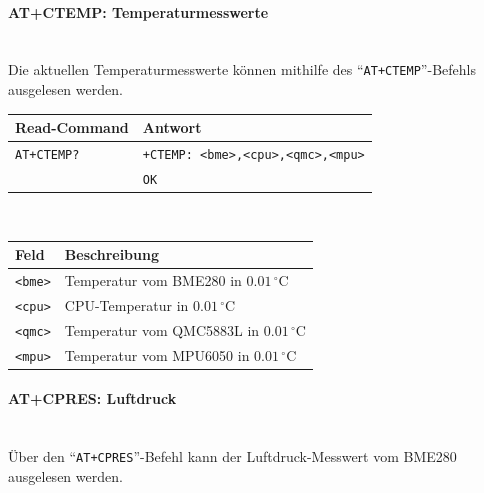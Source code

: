        \paragraph{AT+CTEMP: Temperaturmesswerte}\mbox{}\\
        Die aktuellen Temperaturmesswerte können mithilfe des ``\texttt{AT+CTEMP}''-Befehls ausgelesen werden.
        
        \begin{table}[H]
            \centering
            \begin{tabular}{|p{}|p{}|}
                \hline
                \textbf{Read-Command} &\textbf{Antwort} \\
                \hline
                \texttt{AT+CTEMP?}  & \texttt{+CTEMP: <bme>,<cpu>,<qmc>,<mpu>}\\
                                    & \texttt{OK}\\
                \hline
            \end{tabular}\\[3mm]
            \begin{tabular}{|p{}|p{}|}
                \hline
                \textbf{Feld}       & \textbf{Beschreibung}\\
                \hline
                \texttt{<bme>}      & Temperatur vom BME280 in $0.01\,^\circ\mathrm{C}$\\
                \texttt{<cpu>}      & CPU-Temperatur in $0.01\,^\circ\mathrm{C}$\\
                \texttt{<qmc>}      & Temperatur vom QMC5883L in $0.01\,^\circ\mathrm{C}$\\
                \texttt{<mpu>}      & Temperatur vom MPU6050 in $0.01\,^\circ\mathrm{C}$\\
                \hline
            \end{tabular}
        \end{table}
    
        \paragraph{AT+CPRES: Luftdruck}\mbox{}\\
        Über den ``\texttt{AT+CPRES}''-Befehl kann der Luftdruck-Messwert vom BME280 ausgelesen werden.
        

